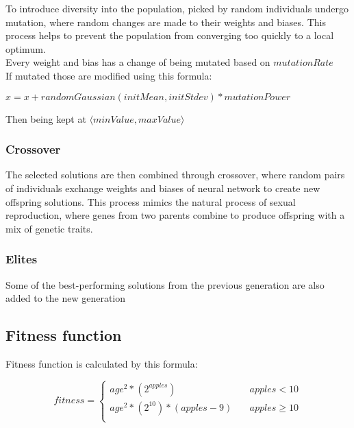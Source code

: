 To introduce diversity into the population, picked by random individuals undergo mutation, where random changes are made to their weights and biases. This process helps to prevent the population from converging too quickly to a local optimum. \\

Every weight and bias has a change of being mutated based on $mutationRate$ \\

If mutated those are modified using this formula:
\begin{center}
    $x = x + randomGaussian(initMean,initStdev) * mutationPower$ \\
\end{center}

Then being kept at $\langle minValue,maxValue \rangle$

\subsubsection{Crossover}

The selected solutions are then combined through crossover, where random pairs of individuals exchange weights and biases of neural network to create new offspring solutions. This process mimics the natural process of sexual reproduction, where genes from two parents combine to produce offspring with a mix of genetic traits.



\subsubsection{Elites}

Some of the best-performing solutions from the previous generation are also added to the new generation

\subsection{Fitness function}

Fitness function is calculated by this formula:


\begin{center}
    \[ fitness =
  \begin{cases}
    age^2 * (2^{apples})       & \quad apples < 10\\
    age^2 * (2^{10}) * (apples-9)       & \quad apples \geq 10\\
  \end{cases}
\]
\end{center}

